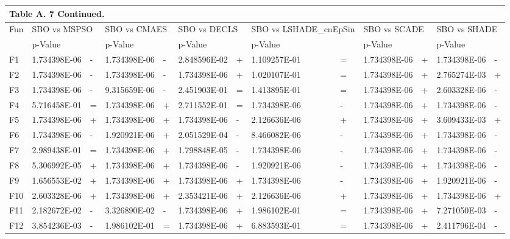 \documentclass{article} %
\begin{document}
\begin{tabular}{|p{0.3in}|p{0.6in}|p{0.1in}|p{0.6in}|p{0.2in}|p{0.6in}|p{0.2in}|p{0.6in}|p{0.2in}|p{0.6in}|p{0.2in}|p{0.6in}|p{0.2in}|} \hline 
\multicolumn{13}{|p{1in}|}{Table A. 7 Continued.} \\ \hline 
Fun & \multicolumn{2}{|p{0.8in}|}{SBO vs MSPSO} & \multicolumn{2}{|p{0.8in}|}{SBO vs CMAES} & \multicolumn{2}{|p{0.8in}|}{SBO vs DECLS} & \multicolumn{2}{|p{0.8in}|}{SBO vs LSHADE\_cnEpSin} & \multicolumn{2}{|p{0.8in}|}{SBO vs SCADE} & \multicolumn{2}{|p{0.8in}|}{SBO vs SHADE} \\ \hline 
 & p-Value &  & p-Value &  & p-Value &  & p-Value &  & p-Value &  & p-Value &  \\ \hline 
F1 & 1.734398E-06 & - & 1.734398E-06 & - & 2.848596E-02 & + & 1.109257E-01 & = & 1.734398E-06 & + & 1.734398E-06 & - \\ \hline 
F2 & 1.734398E-06 & - & 1.734398E-06 & - & 1.734398E-06 & + & 1.020107E-01 & = & 1.734398E-06 & + & 2.765274E-03 & + \\ \hline 
F3 & 1.734398E-06 & - & 9.315659E-06 & - & 2.451903E-01 & = & 1.413895E-01 & = & 1.734398E-06 & + & 2.603328E-06 & - \\ \hline 
F4 & 5.716458E-01 & = & 1.734398E-06 & + & 2.711552E-01 & = & 1.734398E-06 & - & 1.734398E-06 & + & 1.734398E-06 & - \\ \hline 
F5 & 1.734398E-06 & + & 1.734398E-06 & + & 1.734398E-06 & - & 2.126636E-06 & + & 1.734398E-06 & + & 3.609433E-03 & + \\ \hline 
F6 & 1.734398E-06 & - & 1.920921E-06 & + & 2.051529E-04 & - & 8.466082E-06 & - & 1.734398E-06 & + & 1.734398E-06 & - \\ \hline 
F7 & 2.989438E-01 & = & 1.734398E-06 & + & 1.798848E-05 & - & 1.734398E-06 & - & 1.734398E-06 & + & 1.734398E-06 & - \\ \hline 
F8 & 5.306992E-05 & + & 1.734398E-06 & + & 1.734398E-06 & - & 1.920921E-06 & - & 1.734398E-06 & + & 1.734398E-06 & - \\ \hline 
F9 & 1.656553E-02 & + & 1.734398E-06 & + & 1.734398E-06 & + & 1.734398E-06 & - & 1.734398E-06 & + & 1.920921E-06 & - \\ \hline 
F10 & 2.603328E-06 & + & 1.734398E-06 & + & 2.353421E-06 & + & 2.126636E-06 & + & 1.734398E-06 & + & 1.734398E-06 & + \\ \hline 
F11 & 2.182672E-02 & - & 3.326890E-02 & - & 1.734398E-06 & + & 1.986102E-01 & = & 1.734398E-06 & + & 7.271050E-03 & - \\ \hline 
F12 & 3.854236E-03 & - & 1.986102E-01 & = & 1.734398E-06 & + & 6.883593E-01 & = & 1.734398E-06 & + & 2.411796E-04 & - \\ \hline 

\end{tabular}
\end{document}
